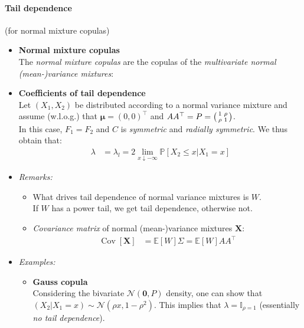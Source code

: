 \documentclass[a4paper,landscape,8pt,fleqn]{scrartcl}
\newcommand*\widefbox[1]{\fbox{\hspace{2em}#1\hspace{2em}}}		%
\renewcommand{\emph}[1]{\textbf{#1}}
\DeclareMathOperator{\Cov}{Cov}				%
\begin{document}
\begin{multicols*}{3}
\paragraph{Tail dependence} (for normal mixture copulas)
\begin{itemize}
\item \emph{Normal mixture copulas} \\
The \textit{normal mixture copulas} are the copulas of the \textit{multivariate normal (mean-)variance mixtures}:
\item \emph{Coefficients of tail dependence} \\
Let $(X_1, X_2)$ be distributed according to a normal variance mixture and assume (w.l.o.g.) that $\bm \mu = (0,0)^\top$ and $A A^\top = P = \begin{psmallmatrix} 1 & \rho \\ \rho & 1 \end{psmallmatrix}$. \\
In this case, $F_1 = F_2$ and $C$ is \textit{symmetric} and \textit{radially symmetric}. We thus obtain that:
\begin{align*}
\lambda &= \lambda_l = 2 \lim_{x \downarrow -\infty} \mathbb{P}[X_2 \leq x | X_1 = x]
\end{align*}
\item \textit{Remarks:}
\begin{itemize}
\item What drives tail dependence of normal variance mixtures is $W$. \\
If $W$ has a power tail, we get tail dependence, otherwise not.
\item \textit{Covariance matrix} of normal (mean-)variance mixtures $\bm X$:
\begin{align*}
\Cov[\bm X] &= \mathbb{E}[W] \Sigma = \mathbb{E}[W] A A^\top
\end{align*}
\end{itemize}
\item \textit{Examples:}
\begin{itemize}
\item \emph{Gauss copula} \\
Considering the bivariate $\mathcal{N}(\bm 0, P)$ density, one can show that $(X_2 | X_1 = x) \sim \mathcal{N}(\rho x, 1-\rho^2)$. This implies that $\lambda = \mathbb{I}_{\rho = 1}$ (essentially \textit{no tail dependence}).

\end{itemize}
\end{itemize}
\end{multicols*}
\end{document}
